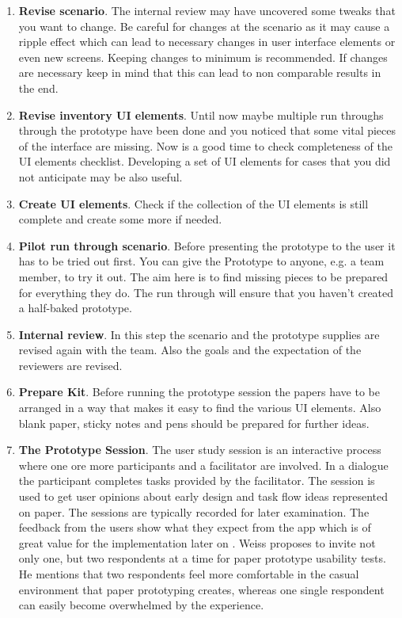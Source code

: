 \begin{enumerate}
	\item \textbf{Revise scenario}. The internal review may have uncovered some tweaks that you want to change. Be careful for changes at the scenario as it may cause a ripple effect which can lead to necessary changes in user interface elements or even new screens. Keeping changes to minimum is recommended. If changes are necessary keep in mind that this can lead to non comparable results in the end.
	
	
	\item \textbf{Revise inventory UI elements}.
	Until now maybe multiple run throughs through the prototype have been done and you noticed that some vital pieces of the interface are missing. Now is a good time to check completeness of the UI elements checklist. Developing a set of UI elements for cases that you did not anticipate may be also useful.
	
	\item \textbf{Create UI elements}.
	Check if the collection of the UI elements is still complete and create some more if needed.
	
	\item \textbf{Pilot run through scenario}. Before presenting the prototype to the user it has to be tried out first. You can give the Prototype to anyone, e.g. a team member, to try it out. The aim here is to find missing pieces to be prepared for everything they do. The run through will ensure that you haven't created a half-baked prototype.
	
	\item \textbf{Internal review}. 	
	In this step the scenario and the prototype supplies are revised again with the team. Also the goals and the expectation of the reviewers are revised.
	
	\item \textbf{Prepare Kit}. Before running the prototype session the papers have to be arranged in a way that makes it easy to find the various UI elements. Also blank paper, sticky notes and pens should be prepared for further ideas.
	
	\item \textbf{The Prototype Session}. The user study session is an interactive process where one ore more participants and a facilitator are involved. In a dialogue the participant completes tasks provided by the facilitator. The session is used to get user opinions about early design and task flow ideas represented on paper. The sessions are typically recorded for later examination. The feedback from the users show what they expect from the app which is of great value for the implementation later on \cite{snyder2003paper}. Weiss  \cite[p.~144]{weiss2003handheld} proposes to invite not only one, but two respondents at a time for paper prototype usability tests. He mentions that two respondents feel more comfortable in the casual environment that paper prototyping creates, whereas one single respondent can easily become overwhelmed by the experience.
	

\end{enumerate}

